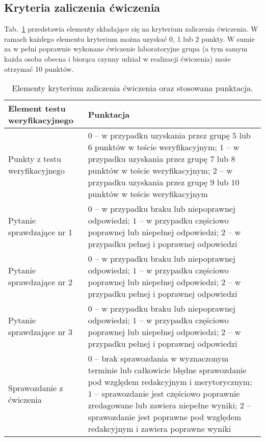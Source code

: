 \documentclass[11pt,onecolumn]{article}
\begin{document}
\subsection{Kryteria zaliczenia ćwiczenia} \label{sub:kryteria_zal}
%
Tab.~\ref{tab:elem_kryterium_zal} przedstawia elementy składające się na kryterium zaliczenia ćwiczenia. W ramach każdego elementu kryterium można uzyskać 0, 1 lub 2 punkty. W sumie za w pełni poprawnie wykonane ćwiczenie laboratoryjne grupa (a tym samym każda osoba obecna i biorąca czynny udział w realizacji ćwiczenia) może otrzymać 10 punktów.
\begin{table}[!ht]
\renewcommand{\arraystretch}{1.3}
\caption{Elementy kryterium zaliczenia ćwiczenia oraz stosowana punktacja.}
\label{tab:elem_kryterium_zal}
\centering
\begin{tabular}{|l|p{9cm}|}
\hline
\textbf{Element testu weryfikacyjnego} & \textbf{Punktacja} \\
\hline
\hline
Punkty z testu weryfikacyjnego & $0$ – w przypadku uzyskania przez grupę $5$ lub $6$ punktów w teście weryfikacyjnym; $1$ – w przypadku uzyskania przez grupę $7$ lub $8$ punktów w teście weryfikacyjnym; $2$ – w przypadku uzyskania przez grupę $9$ lub $10$ punktów w teście weryfikacyjnym \\
\hline
Pytanie sprawdzające nr 1 & $0$ – w przypadku braku lub niepoprawnej odpowiedzi; $1$ – w przypadku częściowo poprawnej lub niepełnej odpowiedzi; $2$ – w przypadku pełnej i poprawnej odpowiedzi \\
\hline
Pytanie sprawdzające nr 2 & $0$ – w przypadku braku lub niepoprawnej odpowiedzi; $1$ – w przypadku częściowo poprawnej lub niepełnej odpowiedzi; $2$ – w przypadku pełnej i poprawnej odpowiedzi \\
\hline
Pytanie sprawdzające nr 3 & $0$ – w przypadku braku lub niepoprawnej odpowiedzi; $1$ – w przypadku częściowo poprawnej lub niepełnej odpowiedzi; $2$ – w przypadku pełnej i poprawnej odpowiedzi \\
\hline
Sprawozdanie z ćwiczenia & $0$ – brak sprawozdania w wyznaczonym terminie lub całkowicie błędne sprawozdanie pod względem redakcyjnym i merytorycznym; $1$ – sprawozdanie jest częściowo poprawnie zredagowane lub zawiera niepełne wyniki; $2$ – sprawozdanie jest poprawne pod względem redakcyjnym i zawiera poprawne wyniki \\
\hline
\end{tabular}
\end{table}



\end{document}
